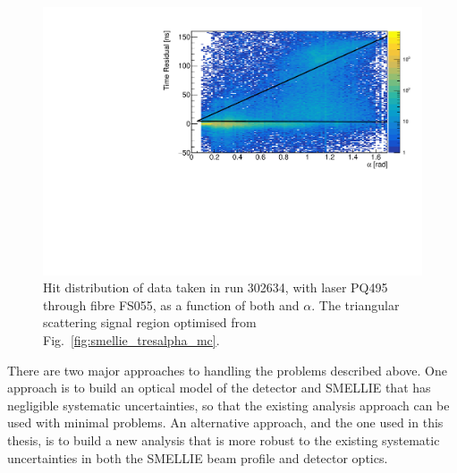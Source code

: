\begin{figure}
    \centering
    \includegraphics[width=\textwidth]{5_SMELLIEAnalysis/images/FS055_PQ495_302634_data_tres_alpha_plot.pdf}
    \caption[Hit distribution of SMELLIE data taken in run \num{302634}, with laser PQ495 through fibre FS055, as a function of both \tres{} and $\alpha$]
    {Hit distribution of data taken in run \num{302634}, with laser PQ495 through fibre FS055, as a function of both \tres{} and $\alpha$. The triangular scattering signal region optimised from Fig.~\ref{fig:smellie_tresalpha_mc}.}
    \label{fig:smellie_tresalpha_data}
\end{figure}

There are two major approaches to handling the problems described above. One approach is to build an optical model of the detector and SMELLIE that has negligible systematic uncertainties, so that the existing analysis approach can be used with minimal problems. An alternative approach, and the one used in this thesis, is to build a new analysis that is more robust to the existing systematic uncertainties in both the SMELLIE beam profile and detector optics.


